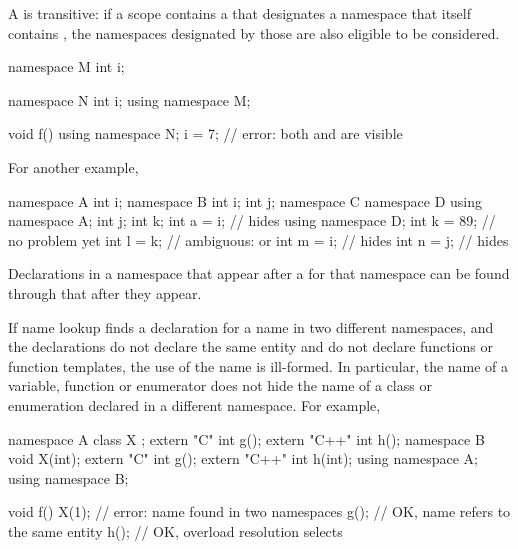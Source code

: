 \pnum
\begin{note}
A  is transitive: if a scope contains a
 that designates a namespace that itself
contains , the namespaces designated by those
 are also eligible to be considered.
\end{note}
\begin{example}
\begin{codeblock}
namespace M {
  int i;
}

namespace N {
  int i;
  using namespace M;
}

void f() {
  using namespace N;
  i = 7;            // error: both  and  are visible
}
\end{codeblock}

For another example,
\begin{codeblock}
namespace A {
  int i;
}
namespace B {
  int i;
  int j;
  namespace C {
    namespace D {
      using namespace A;
      int j;
      int k;
      int a = i;    //  hides 
    }
    using namespace D;
    int k = 89;     // no problem yet
    int l = k;      // ambiguous:  or 
    int m = i;      //  hides 
    int n = j;      //  hides 
  }
}
\end{codeblock}
\end{example}


\pnum
\begin{note}
Declarations in a namespace
that appear after a  for that namespace
can be found through that  after they appear.
\end{note}

\pnum
\begin{note}
If name lookup finds a declaration for a name in two different
namespaces, and the declarations do not declare the same entity and do
not declare functions or function templates, the use of the name is ill-formed.
In particular, the name of a variable, function or enumerator does not
hide the name of a class or enumeration declared in a different
namespace. For example,

\begin{codeblock}
namespace A {
  class X { };
  extern "C"   int g();
  extern "C++" int h();
}
namespace B {
  void X(int);
  extern "C"   int g();
  extern "C++" int h(int);
}
using namespace A;
using namespace B;

void f() {
  X(1);             // error: name  found in two namespaces
  g();              // OK, name  refers to the same entity
  h();              // OK, overload resolution selects 
}
\end{codeblock}
\end{note}

